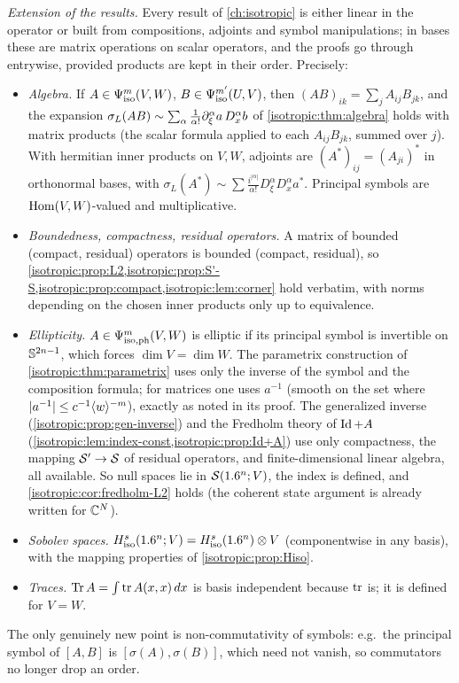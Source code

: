 \emph{Extension of the results.} Every result of \cref{ch:isotropic} is either linear in the operator
or built from compositions, adjoints and symbol manipulations; in bases these are matrix operations
on scalar operators, and the proofs go through entrywise, provided products are kept in their order.
Precisely:
\begin{itemize}
\item \emph{Algebra.} If $A\in\Psi^{m}_{\mathrm{iso}}(V,W)$, $B\in\Psi^{m'}_{\mathrm{iso}}(U,V)$, then $(AB)_{ik}=\sum_jA_{ij}B_{jk}$,
  and the expansion $\sigma_L(AB)\sim\sum_\alpha\frac1{\alpha!}\partial_\xi^\alpha a\,D_x^\alpha b$ of
  \cref{isotropic:thm:algebra} holds with matrix products (the scalar formula applied to each
  $A_{ij}B_{jk}$, summed over $j$). With hermitian inner products on $V,W$, adjoints are
  $(A^*)_{ij}=(A_{ji})^*$ in orthonormal bases, with $\sigma_L(A^*)\sim\sum\frac{i^{|\alpha|}}{\alpha!}D_\xi^\alpha D_x^\alpha a^*$.
  Principal symbols are $\operatorname{Hom}(V,W)$-valued and multiplicative.
\item \emph{Boundedness, compactness, residual operators.} A matrix of bounded (compact, residual)
  operators is bounded (compact, residual), so \cref{isotropic:prop:L2,isotropic:prop:S'-S,isotropic:prop:compact,isotropic:lem:corner}
  hold verbatim, with norms depending on the chosen inner products only up to equivalence.
\item \emph{Ellipticity.} $A\in\Psi^{m}_{\mathrm{iso,ph}}(V,W)$ is elliptic if its principal symbol is invertible on
  $\mathbb{S}^{2n-1}$, which forces $\dim V=\dim W$. The parametrix construction of
  \cref{isotropic:thm:parametrix} uses only the inverse of the symbol and the composition formula;
  for matrices one uses $a^{-1}$ (smooth on the set where $|a^{-1}|\le c^{-1}\langle w\rangle^{-m}$), exactly as
  noted in its proof. The generalized inverse (\cref{isotropic:prop:gen-inverse}) and the
  Fredholm theory of $\operatorname{Id}+A$ (\cref{isotropic:lem:index-const,isotropic:prop:Id+A}) use only
  compactness, the mapping $\mathcal{S}'\to\mathcal{S}$ of residual operators, and finite-dimensional linear algebra,
  all available. So null spaces lie in $\mathcal{S}(1.6^n;V)$, the index is defined, and
  \cref{isotropic:cor:fredholm-L2} holds (the coherent state argument is already written for
  $\mathbb{C}^N$).
\item \emph{Sobolev spaces.} $H^{s}_{\mathrm{iso}}(1.6^n;V)=H^{s}_{\mathrm{iso}}(1.6^n)\otimes V$ (componentwise in any basis), with
  the mapping properties of \cref{isotropic:prop:Hiso}.
\item \emph{Traces.} $\operatorname{Tr} A=\int\operatorname{tr} A(x,x)\,dx$ is basis independent because $\operatorname{tr}$ is; it is defined for
  $V=W$.
\end{itemize}
The only genuinely new point is non-commutativity of symbols: e.g.\ the principal symbol of $[A,B]$ is
$[\sigma(A),\sigma(B)]$, which need not vanish, so commutators no longer drop an order.

